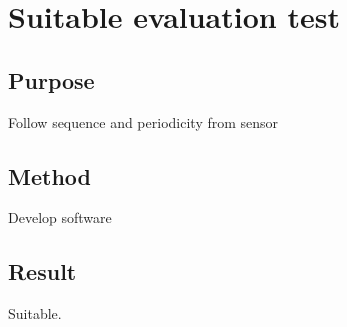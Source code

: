 \section{Suitable evaluation test}
\subsection{Purpose}
Follow sequence and periodicity from sensor
\subsection{Method}
Develop software
\subsection{Result}
Suitable.